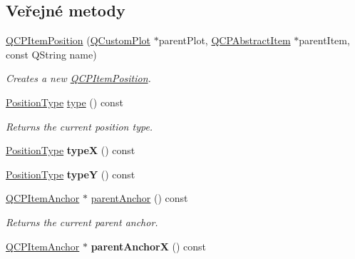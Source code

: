 \subsection*{Veřejné metody}
\begin{DoxyCompactItemize}
\item 
\hyperlink{classQCPItemPosition_a3efc524f37fdcd22907545eb77555ce4}{Q\+C\+P\+Item\+Position} (\hyperlink{classQCustomPlot}{Q\+Custom\+Plot} $\ast$parent\+Plot, \hyperlink{classQCPAbstractItem}{Q\+C\+P\+Abstract\+Item} $\ast$parent\+Item, const Q\+String name)
\begin{DoxyCompactList}\small\item\em Creates a new \hyperlink{classQCPItemPosition}{Q\+C\+P\+Item\+Position}. \end{DoxyCompactList}\item 
\hyperlink{classQCPItemPosition_aad9936c22bf43e3d358552f6e86dbdc8}{Position\+Type} \hyperlink{classQCPItemPosition_aecb709d72c9aa334a7f62e2c9e0b5d60}{type} () const 
\begin{DoxyCompactList}\small\item\em Returns the current position type. \end{DoxyCompactList}\item 
\hypertarget{classQCPItemPosition_a3cb68cf9c95be05c66a0f47448e328e5}{}\hyperlink{classQCPItemPosition_aad9936c22bf43e3d358552f6e86dbdc8}{Position\+Type} {\bfseries type\+X} () const \label{classQCPItemPosition_a3cb68cf9c95be05c66a0f47448e328e5}

\item 
\hypertarget{classQCPItemPosition_a8a2fec9dec1ce006a598b32685fd7ab3}{}\hyperlink{classQCPItemPosition_aad9936c22bf43e3d358552f6e86dbdc8}{Position\+Type} {\bfseries type\+Y} () const \label{classQCPItemPosition_a8a2fec9dec1ce006a598b32685fd7ab3}

\item 
\hyperlink{classQCPItemAnchor}{Q\+C\+P\+Item\+Anchor} $\ast$ \hyperlink{classQCPItemPosition_a7b4ffab9946945c0e11cd2352dc2e042}{parent\+Anchor} () const 
\begin{DoxyCompactList}\small\item\em Returns the current parent anchor. \end{DoxyCompactList}\item 
\hypertarget{classQCPItemPosition_a485abba71c8552086c5f68e95dca7f9a}{}\hyperlink{classQCPItemAnchor}{Q\+C\+P\+Item\+Anchor} $\ast$ {\bfseries parent\+Anchor\+X} () const \label{classQCPItemPosition_a485abba71c8552086c5f68e95dca7f9a}


\end{DoxyCompactItemize}
